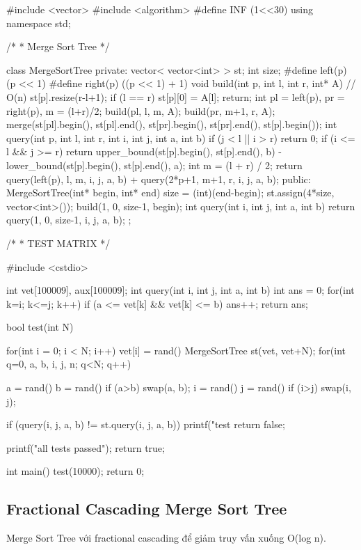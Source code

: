 \documentclass[11pt]{article}
\begin{document}
\begingroup\scriptsize
\begin{vncode}
#include <vector>
#include <algorithm>
#define INF (1<<30)
using namespace std;

/*
 * Merge Sort Tree
 */

class MergeSortTree {
private:
	vector< vector<int> > st;
	int size;
	#define left(p) (p << 1)
	#define right(p) ((p << 1) + 1)
	void build(int p, int l, int r, int* A) { // O(n)
		st[p].resize(r-l+1);
		if (l == r) { st[p][0] = A[l]; return; }
		int pl = left(p), pr = right(p), m = (l+r)/2;
		build(pl, l, m, A);
		build(pr, m+1, r, A);
		merge(st[pl].begin(), st[pl].end(),
			st[pr].begin(), st[pr].end(),
			st[p].begin());
	}
	int query(int p, int l, int r, int i, int j, int a, int b) {
		if (j < l || i > r) return 0;
		if (i <= l && j >= r)
			return upper_bound(st[p].begin(), st[p].end(), b) -
				lower_bound(st[p].begin(), st[p].end(), a);
		int m = (l + r) / 2;
  		return query(left(p), l, m, i, j, a, b) +
			query(2*p+1, m+1, r, i, j, a, b);
	}
public:
	MergeSortTree(int* begin, int* end) {
		size = (int)(end-begin);
		st.assign(4*size, vector<int>());
		build(1, 0, size-1, begin);
	}
	int query(int i, int j, int a, int b) {
		return query(1, 0, size-1, i, j, a, b);
	}
};

/*
 * TEST MATRIX
 */

#include <cstdio>


int vet[100009], aux[100009];
int query(int i, int j, int a, int b) {
	int ans = 0;
	for(int k=i; k<=j; k++) if (a <= vet[k] && vet[k] <= b) ans++;
	return ans;
}

bool test(int N) {
	for(int i = 0; i < N; i++) vet[i] = rand()%
	MergeSortTree st(vet, vet+N);
	for(int q=0, a, b, i, j, n; q<N; q++) {
		a = rand()%
		b = rand()%
		if (a>b) swap(a, b);
		i = rand()%
		j = rand()%
		if (i>j) swap(i, j);

		if (query(i, j, a, b) != st.query(i, j, a, b)) {
			printf("test %
			return false;
		}
	}
	printf("all tests passed\n");
	return true;
}

int main() {
	test(10000);
	return 0;
}
\end{vncode}
\endgroup


\subsection{Fractional Cascading Merge Sort Tree}

Merge Sort Tree với fractional cascading để giảm truy vấn xuống O(log n).
\end{document}
